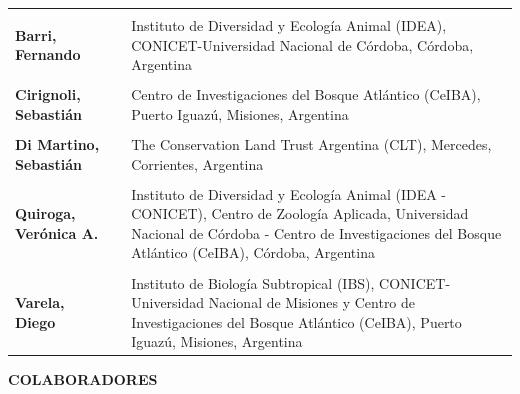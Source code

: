 \documentclass[
  x11names]{article}
\begin{document}
\begin{tabu} to 
\toprule
\textbf{} &  & \\
\textbf{Barri, Fernando} &  & Instituto de Diversidad y Ecología Animal (IDEA), CONICET-Universidad Nacional de Córdoba, Córdoba, Argentina\\
\textbf{} &  & \\
\textbf{Cirignoli, Sebastián} &  & Centro de Investigaciones del Bosque Atlántico (CeIBA), Puerto Iguazú, Misiones, Argentina\\
\textbf{} &  & \\
\addlinespace
\textbf{Di Martino, Sebastián} &  & The Conservation Land Trust Argentina (CLT), Mercedes, Corrientes, Argentina\\
\textbf{} &  & \\
\textbf{Quiroga, Verónica A.} &  & Instituto de Diversidad y Ecología Animal (IDEA - CONICET), Centro de Zoología Aplicada, Universidad Nacional de Córdoba - Centro de Investigaciones del Bosque Atlántico (CeIBA), Córdoba, Argentina\\
\textbf{} &  & \\
\textbf{Varela, Diego} &  & Instituto de Biología Subtropical (IBS), CONICET-Universidad Nacional de Misiones y Centro de Investigaciones del Bosque Atlántico (CeIBA), Puerto Iguazú, Misiones, Argentina\\
\bottomrule
\end{tabu}

\textbf{COLABORADORES}
\end{document}
